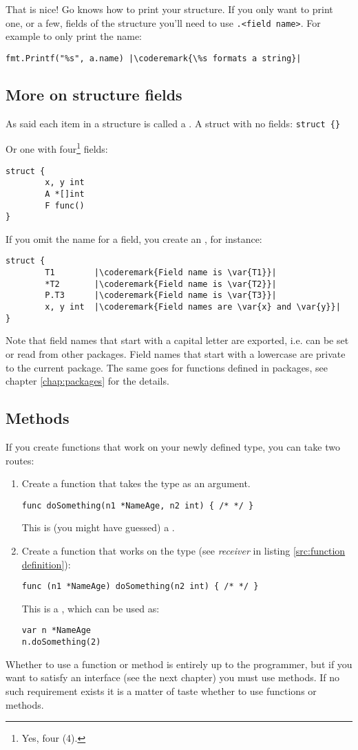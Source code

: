 That is nice!
Go knows how to print your structure. If you
only want to print one, or a few, fields of the structure you'll
need to use \verb|.<field name>|. For example to only print the name:
\begin{lstlisting}
fmt.Printf("%s", a.name) |\coderemark{\%s formats a string}|
\end{lstlisting}

\subsection{More on structure fields}
As said each item in a structure is called a .
A struct with no fields: \lstinline|struct {}|

Or one with four\footnote{Yes, four (4).} fields:
\begin{lstlisting}
struct {
        x, y int
        A *[]int
        F func()
}
\end{lstlisting}
If you omit the name for a field, you create an 
, for instance:
\begin{lstlisting}
struct {
        T1        |\coderemark{Field name is \var{T1}}|
        *T2       |\coderemark{Field name is \var{T2}}|
        P.T3      |\coderemark{Field name is \var{T3}}|
        x, y int  |\coderemark{Field names are \var{x} and \var{y}}|
}
\end{lstlisting}
Note that field names that start with a capital letter are exported, i.e. can be
set or read from other packages. Field names that start with a lowercase are private
to the current package. The same goes for functions defined in packages, see chapter
\ref{chap:packages} for the details.

\subsection{Methods}
\label{sec:methods}
If you create functions that work on your newly defined type, you can
take two routes:
\begin{enumerate}
\item Create a function that takes the type as an argument.
\begin{lstlisting}
func doSomething(n1 *NameAge, n2 int) { /* */ }
\end{lstlisting}
This is (you might have guessed) a .
\item Create a function that works on the type (see \emph{receiver} in
listing \ref{src:function definition}):
\begin{lstlisting}
func (n1 *NameAge) doSomething(n2 int) { /* */ }
\end{lstlisting}
This is a , which can be
used as: 
\begin{lstlisting}
var n *NameAge
n.doSomething(2)
\end{lstlisting}
\end{enumerate}
Whether to use a function or method is entirely up to the programmer, but
if you want to satisfy an interface (see the next chapter) you must use
methods. If no such requirement exists it is a matter of taste whether
to use functions or methods.

